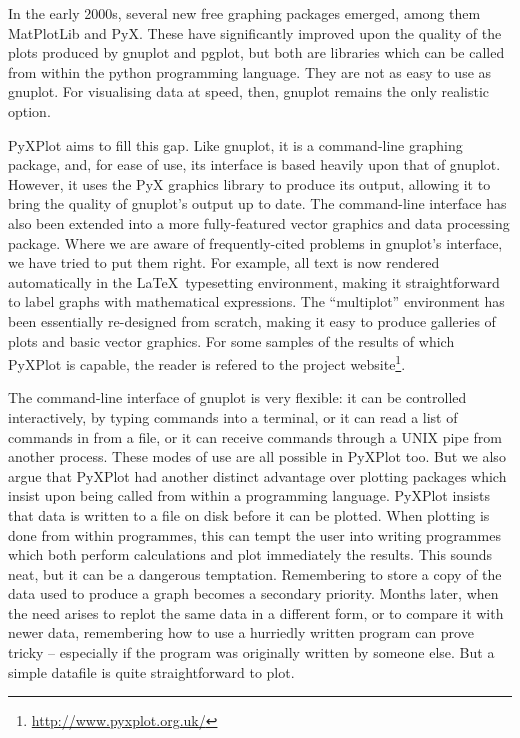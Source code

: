In the early 2000s, several new free graphing packages emerged, among them {\sc
MatPlotLib} and {\sc PyX}.  These have significantly improved upon the quality
of the plots produced by gnuplot and pgplot, but both are libraries which can
be called from within the python programming language. They are not as easy to
use as gnuplot.  For visualising data at speed, then, gnuplot remains the only
realistic option.

{\sc PyXPlot} aims to fill this gap. Like gnuplot, it is a command-line
graphing package, and, for ease of use, its interface is based heavily upon
that of gnuplot. However, it uses the PyX graphics library to produce its
output, allowing it to bring the quality of gnuplot's output up to date.  The
command-line interface has also been extended into a more fully-featured vector
graphics and data processing package.  Where we are aware of frequently-cited
problems in gnuplot's interface, we have tried to put them right.  For example,
all text is now rendered automatically in the \LaTeX\ typesetting environment,
making it straightforward to label graphs with mathematical expressions. The
``multiplot'' environment has been essentially re-designed from scratch, making
it easy to produce galleries of plots and basic vector graphics.  For some
samples of the results of which PyXPlot is capable, the reader is refered to
the project website\footnote{\url{http://www.pyxplot.org.uk/}}.

The command-line interface of gnuplot is very flexible: it can be controlled
interactively, by typing commands into a terminal, or it can read a list of
commands in from a file, or it can receive commands through a UNIX pipe from
another process. These modes of use are all possible in PyXPlot too.  But we
also argue that PyXPlot had another distinct advantage over plotting packages
which insist upon being called from within a programming language. PyXPlot
insists that data is written to a file on disk before it can be plotted. When
plotting is done from within programmes, this can tempt the user into writing
programmes which both perform calculations and plot immediately the results.
This sounds neat, but it can be a dangerous temptation. Remembering to store a
copy of the data used to produce a graph becomes a secondary priority.  Months
later, when the need arises to replot the same data in a different form, or to
compare it with newer data, remembering how to use a hurriedly written program
can prove tricky -- especially if the program was originally written by someone
else. But a simple datafile is quite straightforward to plot.

